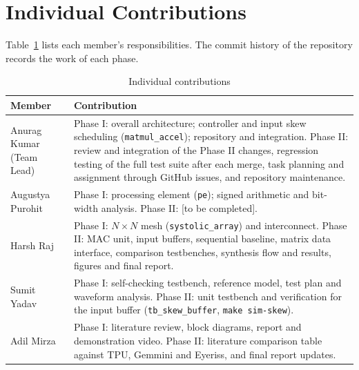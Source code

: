 \documentclass[conference]{IEEEtran}
\begin{document}
\section{Individual Contributions}
Table~\ref{tab:contrib} lists each member's responsibilities. The commit history
of the repository records the work of each phase.

\begin{table}[t]
\caption{Individual contributions}
\label{tab:contrib}
\centering
\begin{tabular}{p{2.3cm}p{5.5cm}}
\toprule
Member & Contribution \\
\midrule
Anurag Kumar (Team Lead) & Phase I: overall architecture; controller and
input skew scheduling (\texttt{matmul\_accel}); repository and integration.
Phase II: review and integration of the Phase II changes, regression
testing of the full test suite after each merge, task planning and
assignment through GitHub issues, and repository maintenance. \\
Augustya Purohit & Phase I: processing element (\texttt{pe}); signed
arithmetic and bit-width analysis. Phase II: [to be completed]. \\
Harsh Raj & Phase I: $N \times N$ mesh (\texttt{systolic\_array}) and
interconnect. Phase II: MAC unit, input buffers, sequential baseline, matrix
data interface, comparison testbenches, synthesis flow and results, figures
and final report. \\
Sumit Yadav & Phase I: self-checking testbench, reference model, test plan
and waveform analysis. Phase II: unit testbench and verification for the
input buffer (\texttt{tb\_skew\_buffer}, \texttt{make sim-skew}). \\
Adil Mirza & Phase I: literature review, block diagrams, report and
demonstration video. Phase II: literature comparison table against TPU, Gemmini
and Eyeriss, and final report updates. \\
\bottomrule
\end{tabular}
\end{table}

\end{document}
